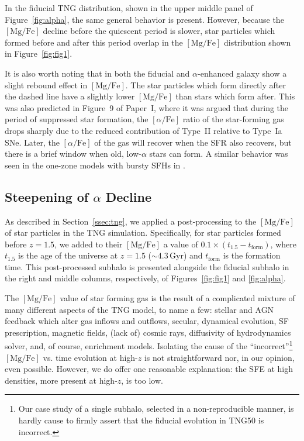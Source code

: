 \documentclass[twocolumn]{aastex631}
\newcommand{\Gyr}{\ensuremath{\textrm{Gyr}}}
\newcommand{\MgFe}{\ensuremath{[\textrm{Mg}/\textrm{Fe}]}}
\newcommand{\alphaFe}{\ensuremath{[\alpha/\textrm{Fe}]}}
\begin{document}
In the fiducial TNG distribution, shown in the upper middle panel of Figure~\ref{fig:alpha}, the same general behavior is present. However, because the \MgFe{} decline before the quiescent period is slower, star particles which formed before and after this period overlap in the \MgFe{} distribution shown in Figure~\ref{fig:fig1}.

It is also worth noting that in both the fiducial and $\alpha$-enhanced galaxy show a slight rebound effect in \MgFe{}. The star particles which form directly after the dashed line have a slightly lower \MgFe{} than stars which form after. This was also predicted in Figure~9 of Paper~I, where it was argued that during the period of suppressed star formation, the \alphaFe{} ratio of the star-forming gas drops sharply due to the reduced contribution of Type~II relative to Type~Ia SNe. Later, the \alphaFe{} of the gas will recover when the SFR also recovers, but there is a brief window when old, low-$\alpha$ stars can form. A similar behavior was seen in the one-zone models with bursty SFHs in \citet{2020MNRAS.498.1364J}.

\subsection{Steepening of $\alpha$ Decline}\label{ssec:sfe}
As described in Section~\ref{ssec:tng}, we applied a post-processing to the \MgFe{} of star particles in the TNG simulation. Specifically, for star particles formed before $z=1.5$, we added to their \MgFe{} a value of $0.1\times\left(t_{1.5}-t_{\textrm{form}}\right)$, where $t_{1.5}$ is the age of the universe at $z=1.5$ ($\sim4.3\,\Gyr$) and $t_{\textrm{form}}$ is the formation time. This post-processed subhalo is presented alongside the fiducial subhalo in the right and middle columns, respectively, of Figures~\ref{fig:fig1} and \ref{fig:alpha}.

The \MgFe{} value of star forming gas is the result of a complicated mixture of many different aspects of the TNG model, to name a few: stellar and AGN feedback which alter gas inflows and outflows, secular, dynamical evolution, SF prescription, magnetic fields, (lack of) cosmic rays, diffusivity of hydrodynamics solver, and, of course, enrichment models. Isolating the cause of the ``incorrect''\footnote{Our case study of a single subhalo, selected in a non-reproducible manner, is hardly cause to firmly assert that the fiducial evolution in TNG50 is incorrect.} \MgFe{} vs. time evolution at high-$z$ is not straightforward nor, in our opinion, even possible. However, we do offer one reasonable explanation: the SFE at high densities, more present at high-$z$, is too low.
\end{document}
